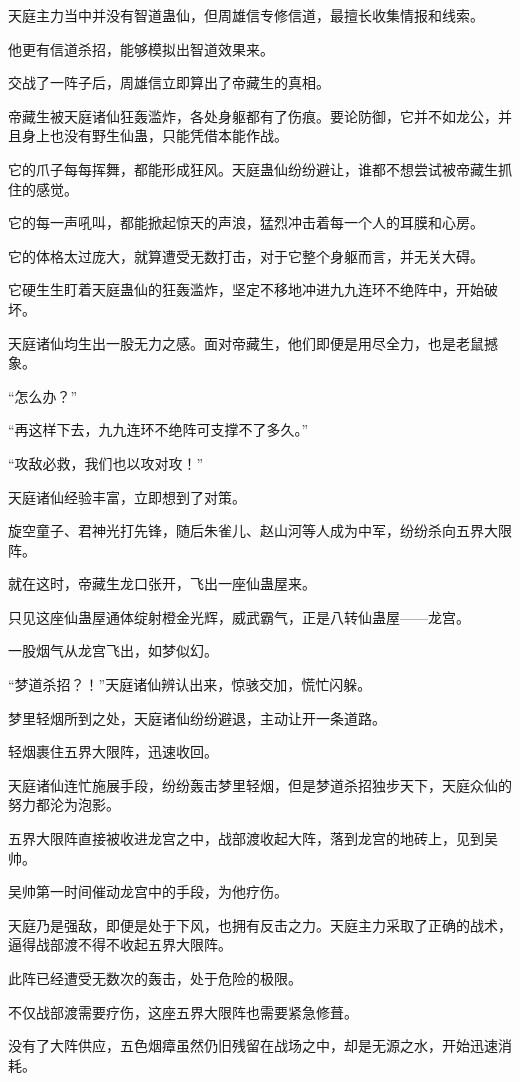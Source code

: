 \begin{this_body}
天庭主力当中并没有智道蛊仙，但周雄信专修信道，最擅长收集情报和线索。

他更有信道杀招，能够模拟出智道效果来。

交战了一阵子后，周雄信立即算出了帝藏生的真相。

帝藏生被天庭诸仙狂轰滥炸，各处身躯都有了伤痕。要论防御，它并不如龙公，并且身上也没有野生仙蛊，只能凭借本能作战。

它的爪子每每挥舞，都能形成狂风。天庭蛊仙纷纷避让，谁都不想尝试被帝藏生抓住的感觉。

它的每一声吼叫，都能掀起惊天的声浪，猛烈冲击着每一个人的耳膜和心房。

它的体格太过庞大，就算遭受无数打击，对于它整个身躯而言，并无关大碍。

它硬生生盯着天庭蛊仙的狂轰滥炸，坚定不移地冲进九九连环不绝阵中，开始破坏。

天庭诸仙均生出一股无力之感。面对帝藏生，他们即便是用尽全力，也是老鼠撼象。

“怎么办？”

“再这样下去，九九连环不绝阵可支撑不了多久。”

“攻敌必救，我们也以攻对攻！”

天庭诸仙经验丰富，立即想到了对策。

旋空童子、君神光打先锋，随后朱雀儿、赵山河等人成为中军，纷纷杀向五界大限阵。

就在这时，帝藏生龙口张开，飞出一座仙蛊屋来。

只见这座仙蛊屋通体绽射橙金光辉，威武霸气，正是八转仙蛊屋——龙宫。

一股烟气从龙宫飞出，如梦似幻。

“梦道杀招？！”天庭诸仙辨认出来，惊骇交加，慌忙闪躲。

梦里轻烟所到之处，天庭诸仙纷纷避退，主动让开一条道路。

轻烟裹住五界大限阵，迅速收回。

天庭诸仙连忙施展手段，纷纷轰击梦里轻烟，但是梦道杀招独步天下，天庭众仙的努力都沦为泡影。

五界大限阵直接被收进龙宫之中，战部渡收起大阵，落到龙宫的地砖上，见到吴帅。

吴帅第一时间催动龙宫中的手段，为他疗伤。

天庭乃是强敌，即便是处于下风，也拥有反击之力。天庭主力采取了正确的战术，逼得战部渡不得不收起五界大限阵。

此阵已经遭受无数次的轰击，处于危险的极限。

不仅战部渡需要疗伤，这座五界大限阵也需要紧急修葺。

没有了大阵供应，五色烟瘴虽然仍旧残留在战场之中，却是无源之水，开始迅速消耗。


\end{this_body}
